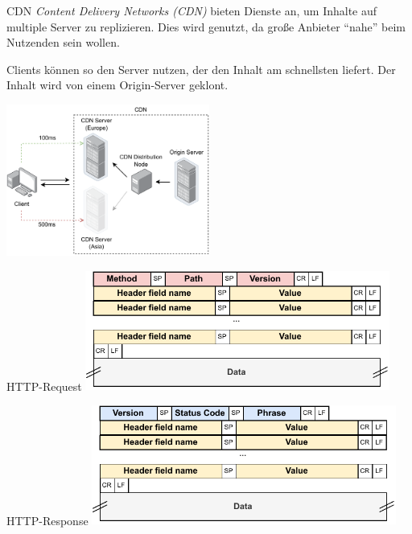 \begin{defi}{CDN}
    \emph{Content Delivery Networks (CDN)} bieten Dienste an, um Inhalte auf multiple Server zu replizieren.
    Dies wird genutzt, da große Anbieter \enquote{nahe} beim Nutzenden sein wollen.

    Clients können so den Server nutzen, der den Inhalt am schnellsten liefert.
    Der Inhalt wird von einem Origin-Server geklont.

    \begin{center}
        \includegraphics[width=0.5\textwidth]{includes/figures/defi_cdn.pdf}
    \end{center}
\end{defi}

\begin{defi}{HTTP-Request}
    \centering
    \includegraphics[width=0.75\textwidth]{includes/figures/defi_http_request_header.pdf}
\end{defi}

\begin{defi}{HTTP-Response}
    \centering
    \includegraphics[width=0.75\textwidth]{includes/figures/defi_http_response_header.pdf}
\end{defi}

